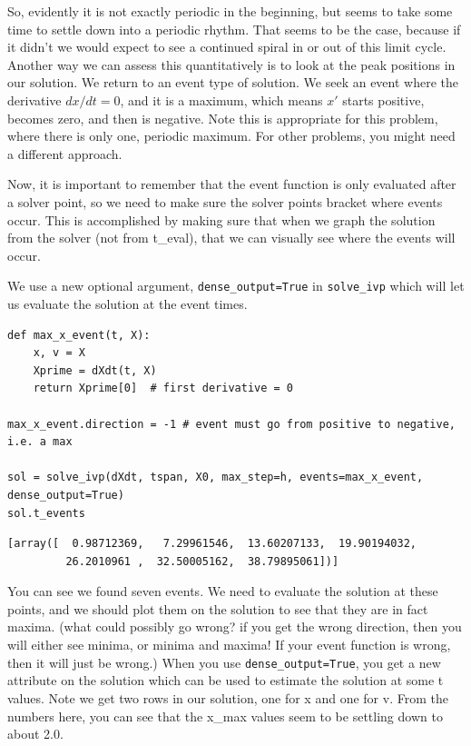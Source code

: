 \documentclass[11pt]{article}
\begin{document}
So, evidently it is not exactly periodic in the beginning, but seems to take some time to settle down into a periodic rhythm. That seems to be the case, because if it didn't we would expect to see a continued spiral in or out of this limit cycle. Another way we can assess this quantitatively is to look at the peak positions in our solution. We return to an event type of solution. We seek an event where the derivative \(dx/dt=0\), and it is a maximum, which means \(x'\) starts positive, becomes zero, and then is negative. Note this is appropriate for this problem, where there is only one, periodic maximum. For other problems, you might need a different approach.

Now, it is important to remember that the event function is only evaluated after a solver point, so we need to make sure the solver points bracket where events occur. This is accomplished by making sure that when we graph the solution from the solver (not from t\_eval), that we can visually see where the events will occur.

We use a new optional argument, \texttt{dense\_output=True} in \texttt{solve\_ivp} which will let us evaluate the solution at the event times.

\begin{verbatim}
def max_x_event(t, X):
    x, v = X
    Xprime = dXdt(t, X)
    return Xprime[0]  # first derivative = 0

max_x_event.direction = -1 # event must go from positive to negative, i.e. a max

sol = solve_ivp(dXdt, tspan, X0, max_step=h, events=max_x_event, dense_output=True)
sol.t_events
\end{verbatim}

\begin{verbatim}
[array([  0.98712369,   7.29961546,  13.60207133,  19.90194032,
         26.2010961 ,  32.50005162,  38.79895061])]
\end{verbatim}

You can see we found seven events. We need to evaluate the solution at these points, and we should plot them on the solution to see that they are in fact maxima. (what could possibly go wrong? if you get the wrong direction, then you will either see minima, or minima and maxima! If your event function is wrong, then it will just be wrong.) When you use \texttt{dense\_output=True}, you get a new attribute on the solution which can be used to estimate the solution at some t values. Note we get two rows in our solution, one for x and one for v. From the numbers here, you can see that the x\_max values seem to be settling down to about 2.0.
\end{document}
